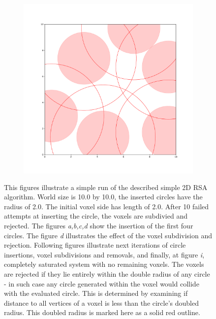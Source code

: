 \documentclass[12pt, oneside]{report}
\begin{document}
\begin{figure}
\begin{subfigure}[b]{0.3\linewidth}
    \caption{}
  \end{subfigure}
  \begin{subfigure}[b]{0.3\linewidth}
    \includegraphics[width=\linewidth]{Images/2dCircleRSA/fig9.pdf}
    \caption{}
  \end{subfigure}

  \caption{This figures illustrate a simple run of the described simple 2D RSA algorithm. \newline
		World size is 10.0 by 10.0, the inserted circles have the radius of 2.0. The initial voxel side has length of 2.0. After 10 failed attempts at inserting the circle, the voxels are subdivied and rejected.\newline
		The figures \textit{a,b,c,d} show the insertion of the first four circles. The figure \textit{d} illustrates the effect of the voxel subdivision and rejection. Following figures illustrate next iterations of circle insertions, voxel subdivisions and removals, and finally, at figure \textit{i}, completely saturated system with no remaining voxels. \newline
		The voxels are rejected if they lie entirely within the double radius of any circle - in such case any circle generated within the voxel would collide with the evaluated circle. This is determined by examining if distance to all vertices of a voxel is less than the circle's doubled radius. This doubled radius is marked here as a solid red outline.}
  \label{VoxelCircleRSApdfExamples}
\end{figure}
\end{document}
